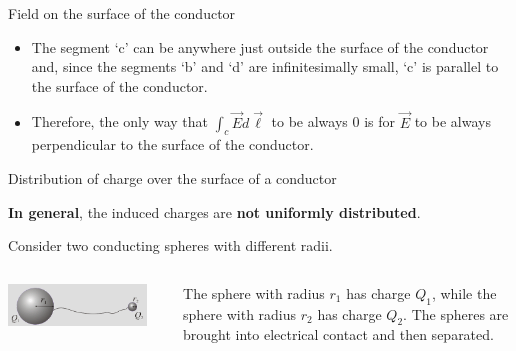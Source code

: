 \begin{frame}{Field on the surface of the conductor}
\begin{itemize}
  \item The segment `c' can be anywhere just outside the surface of the conductor and, since the segments `b' and `d' are
        infinitesimally small, `c' is parallel to the surface of the conductor.
  \item Therefore, the only way that $\int_{c} \vec{E} d\vec{\ell}$ to be always 0 is for $\vec{E}$ to be
        always perpendicular to the surface of the conductor.
\end{itemize}

\end{frame}



%
%
%

\begin{frame}{Distribution of charge over the surface of a conductor}

{\bf In general}, the induced charges are {\bf not uniformly distributed}.\\
\vspace{0.4cm}

Consider two conducting spheres with different radii.\\
\vspace{0.2cm}

\begin{columns}
  \begin{column}{0.33\textwidth}
  {\small
      \begin{center}
        \includegraphics[width=0.90\textwidth]{./images/schematics/two_electrically_connected_spheres.png}
      \end{center}
  }
  \end{column}
  \begin{column}{0.67\textwidth}
  {\small
    The sphere with radius $r_1$ has charge $Q_1$, while the sphere with radius $r_2$ has charge $Q_2$.
    The spheres are brought into electrical contact and then separated.
  }
  \end{column}
\end{columns}

\vspace{0.3cm}


\end{frame}
